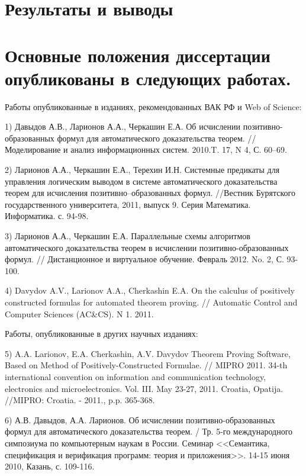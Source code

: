 \documentclass[a4paper]{report}
\begin{document}
\section*{Результаты и выводы}  %


\section*{Основные положения диссертации опубликованы в следующих работах.}

Работы опубликованные в изданиях, рекомендованных ВАК РФ и Web of Science:

1) Давыдов А.В., Ларионов А.А., Черкашин Е.А. Об исчислении
позитивно-образованных формул для автоматического доказательства
теорем. // Моделирование и анализ информационных систем. 2010.T. 17, N
4, С. 60--69.

2) Ларионов А.А., Черкашин Е.А., Терехин И.Н. Системные предикаты для
управления логическим выводом в системе автоматического доказательства
теорем для исчисления позитивно--образованных формул. //Вестник
Бурятского государственного университета, 2011, выпуск 9. Серия
Математика. Информатика. с. 94-98.

3) Ларионов А.А., Черкашин Е.А. Параллельные схемы алгоритмов
автоматического доказательства теорем в исчислении
позитивно-образованных формул. // Дистанционное и виртуальное
обучение. Февраль 2012. No. 2, С. 93-100.

4) Davydov A.V., Larionov A.A., Cherkashin E.A. On the calculus of
positively constructed formulas for automated theorem proving. //
Automatic Control and Computer Sciences (AC\&CS). N 1. 2011.

Работы, опубликованные в других научных изданиях:

5) A.A. Larionov, E.A. Cherkashin, A.V. Davydov Theorem Proving
Software, Based on Method of Positively-Constructed Formulae. // MIPRO
2011. 34-th international convention on information and communication
technology, electronics and microelectronics. Vol. III. May 23-27,
2011. Croatia, Opatija. //MIPRO: Croatia. - 2011., p.p. 365-368.

6) А.В. Давыдов, А.А. Ларионов. Об исчислении позитивно-образованных
формул для автоматического доказательства теорем. / Тр. 5-го
международного симпозиума по компьютерным наукам в России. Семинар
<<Семантика, спецификация и верификация программ: теория и приложения>>.
14-15 июня 2010, Казань, с. 109-116.
\end{document}
